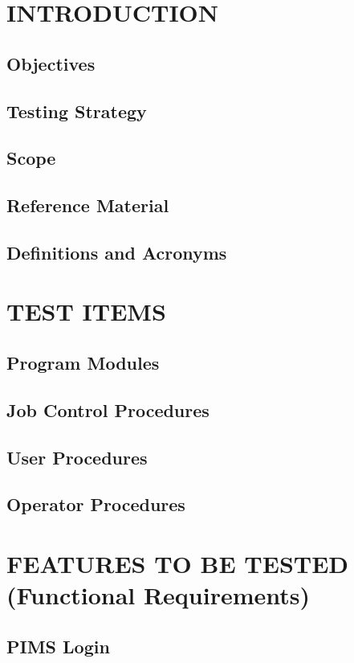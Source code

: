 \documentclass[a4paper,12pt,titlepage,margin=1in]{article}
\begin{document}


\tableofcontents
\newpage

\section{INTRODUCTION}  
	\subsection{Objectives}
		
	\subsection{Testing Strategy}
	\subsection{Scope}	
	\subsection{Reference Material}
	\subsection{Definitions and Acronyms}
	

\section{TEST ITEMS}
	\subsection{Program Modules}
	\subsection{Job Control Procedures}
	\subsection{User Procedures}
	\subsection{Operator Procedures}
	
\section{FEATURES TO BE TESTED (Functional Requirements)}
	\subsection{PIMS Login}
	
\end{document}
